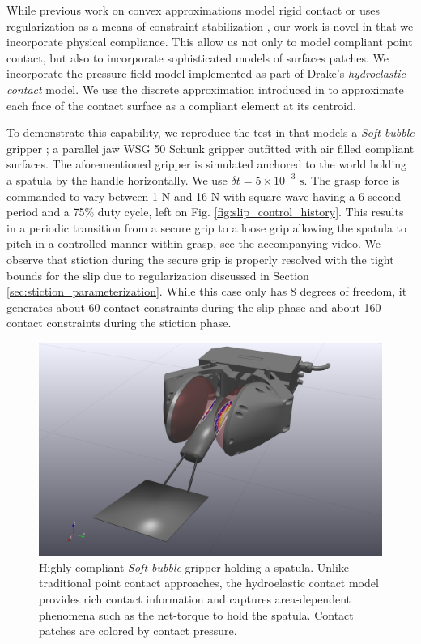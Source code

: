 While previous work on convex approximations model rigid contact
\cite{bib:anitescu2006,bib:mazhar2014} or uses regularization as a means of
constraint stabilization \cite{bib:todorov2014}, our work is novel in that we
incorporate physical compliance. This allow us not only to model compliant point
contact, but also to incorporate sophisticated models of surfaces patches. We
incorporate the pressure field model \cite{bib:elandt2019pressure} implemented
as part of Drake's \cite{bib:drake} \emph{hydroelastic contact} model. We use
the discrete approximation introduced in \cite{bib:masterjohn2021discrete}
to approximate each face of the contact surface as a compliant element at its
centroid.

To demonstrate this capability, we reproduce the test in \cite{bib:masterjohn2021discrete} that models a \emph{Soft-bubble} gripper
\cite{bib:kuppuswamy2020soft}; a parallel jaw WSG 50 Schunk gripper outfitted
with air filled compliant surfaces. The aforementioned gripper is simulated
anchored to the world holding a spatula by the handle horizontally. We use $\delta t=5\times 10^{-3}\text{ s}$. The grasp
force is commanded to vary between 1 N and 16 N with square wave having a 6
second period and a 75\% duty cycle, left on Fig.
\ref{fig:slip_control_history}. This results in a periodic transition from a
secure grip to a loose grip allowing the spatula to pitch in a controlled manner
within grasp, see the accompanying video. We observe that stiction during the
secure grip is properly resolved with the tight bounds for the slip due to
regularization discussed in Section \ref{sec:stiction_parameterization}. While
this case only has 8 degrees of freedom, it generates about 60 contact
constraints during the slip phase and about 160 contact constraints during the
stiction phase.

\begin{figure}[!h]
	\centering
	\includegraphics[width=0.8\columnwidth]{figures/slip_control/slip_control_single_frame.png}
	\caption{\label{fig:slip_control_frame} 
	Highly compliant \emph{Soft-bubble} gripper \cite{bib:kuppuswamy2020soft}
	holding a spatula. Unlike traditional point contact approaches, the
	hydroelastic contact model provides rich contact information and captures
	area-dependent phenomena such as the net-torque to hold the spatula. Contact
	patches are colored by contact pressure.}
\end{figure}

